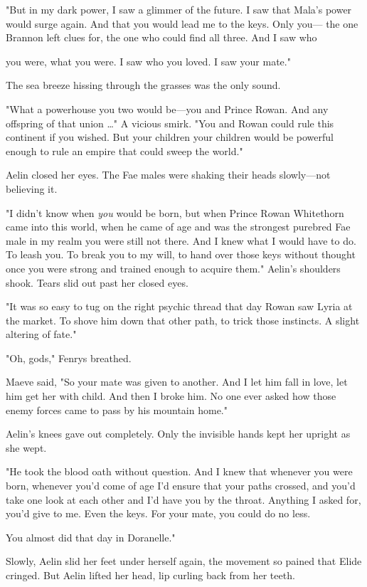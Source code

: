 "But in my dark power, I saw a glimmer of the future. I saw that Mala's power would surge again. And that you would lead me to the keys. Only you--- the one Brannon left clues for, the one who could find all three. And I saw who

you were, what you were. I saw who you loved. I saw your mate."

The sea breeze hissing through the grasses was the only sound.

"What a powerhouse you two would be---you and Prince Rowan. And any offspring of that union \ldots" A vicious smirk. "You and Rowan could rule this continent if you wished. But your children  your children would be powerful enough to rule an empire that could sweep the world."

Aelin closed her eyes. The Fae males were shaking their heads slowly---not believing it.

"I didn't know when \emph{you} would be born, but when Prince Rowan Whitethorn came into this world, when he came of age and was the strongest purebred Fae male in my realm  you were still not there. And I knew what I would have to do. To leash you. To break you to my will, to hand over those keys without thought once you were strong and trained enough to acquire them." Aelin's shoulders shook. Tears slid out past her closed eyes.

"It was so easy to tug on the right psychic thread that day Rowan saw Lyria at the market. To shove him down that other path, to trick those instincts. A slight altering of fate."

"Oh, gods," Fenrys breathed.

Maeve said, "So your mate was given to another. And I let him fall in love, let him get her with child. And then I broke him. No one ever asked how those enemy forces came to pass by his mountain home."

Aelin's knees gave out completely. Only the invisible hands kept her upright as she wept.

"He took the blood oath without question. And I knew that whenever you were born, whenever you'd come of age  I'd ensure that your paths crossed, and you'd take one look at each other and I'd have you by the throat. Anything I asked for, you'd give to me. Even the keys. For your mate, you could do no less.

You almost did that day in Doranelle."

Slowly, Aelin slid her feet under herself again, the movement so pained that Elide cringed. But Aelin lifted her head, lip curling back from her teeth.

